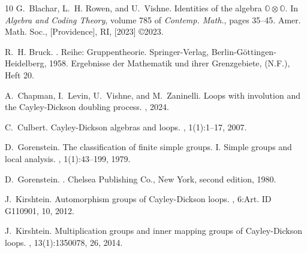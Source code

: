 \documentclass{jonasart}
\begin{document}
	{\footnotesize
	    \begin{thebibliography}{10}
            G.~Blachar, L.~H. Rowen, and U.~Vishne.
            \newblock Identities of the algebra {$\mathbb{O} \otimes\mathbb{O}$}.
            \newblock In {\em Algebra and Coding Theory}, volume 785 of {\em Contemp. Math.}, pages 35--45. Amer. Math. Soc., [Providence], RI, [2023] \copyright 2023.
            
            R.~H. Bruck.
            .
            \newblock Reihe: Gruppentheorie. Springer-Verlag, Berlin-G\"ottingen-Heidelberg, 1958.
            \newblock Ergebnisse der Mathematik und ihrer Grenzgebiete, (N.F.), Heft 20.
            
            A.~Chapman, I.~Levin, U.~Vishne, and M.~Zaninelli.
            \newblock Loops with involution and the {C}ayley-{D}ickson doubling process.
            , 2024.
            
            C.~Culbert.
            \newblock Cayley-{D}ickson algebras and loops.
            , 1(1):1--17, 2007.
            
            D.~Gorenstein.
            \newblock The classification of finite simple groups. {I}. {S}imple groups and local analysis.
            , 1(1):43--199, 1979.
            
            D.~Gorenstein.
            .
            \newblock Chelsea Publishing Co., New York, second edition, 1980.
            
            J.~Kirshtein.
            \newblock Automorphism groups of {C}ayley-{D}ickson loops.
            , 6:Art. ID G110901, 10, 2012.
            
            J.~Kirshtein.
            \newblock Multiplication groups and inner mapping groups of {C}ayley-{D}ickson loops.
            , 13(1):1350078, 26, 2014.
            

\end{thebibliography}}
\end{document}
